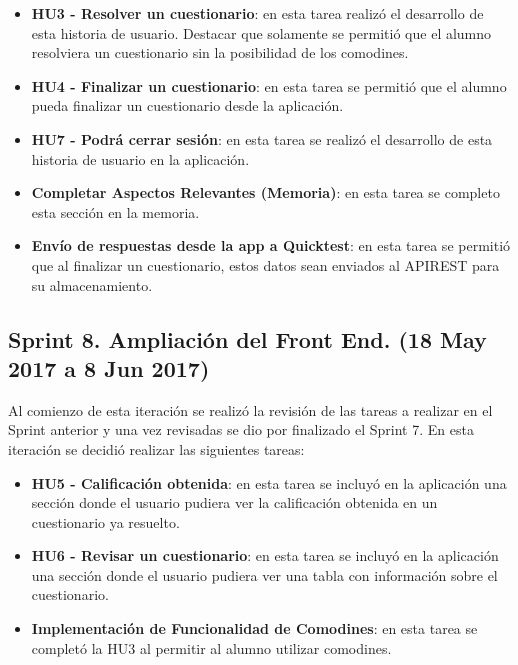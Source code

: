 \begin{itemize}

	\item \textbf{HU3 - Resolver un cuestionario}: en esta tarea realizó el desarrollo de esta historia de usuario. Destacar que solamente se permitió que el alumno resolviera un cuestionario sin la posibilidad de los comodines.
	\item \textbf{HU4 - Finalizar un cuestionario}: en esta tarea se permitió que el alumno pueda finalizar un cuestionario desde la aplicación.
	\item \textbf{HU7 - Podrá cerrar sesión}: en esta tarea se realizó el desarrollo de esta historia de usuario en la aplicación.
	\item \textbf{Completar Aspectos Relevantes (Memoria)}: en esta tarea se completo esta sección en la memoria.
	\item \textbf{Envío de respuestas desde la app a Quicktest}: en esta tarea se permitió que al finalizar un cuestionario, estos datos sean enviados al APIREST para su almacenamiento.


\end{itemize}



\subsection{Sprint 8. Ampliación del Front End. (18 May 2017 a 8 Jun 2017)}

Al comienzo de esta iteración se realizó la revisión de las tareas a realizar en el Sprint anterior y una vez revisadas se dio por finalizado el Sprint 7. 
En esta iteración se decidió realizar las siguientes tareas:

\begin{itemize}

	\item \textbf{HU5 - Calificación obtenida}: en esta tarea se incluyó en la aplicación una sección donde el usuario pudiera ver la calificación obtenida en un cuestionario ya resuelto.
	\item \textbf{HU6 - Revisar un cuestionario}: en esta tarea se incluyó en la aplicación una sección donde el usuario pudiera ver una tabla con información sobre el cuestionario.
	\item \textbf{Implementación de Funcionalidad de Comodines}: en esta tarea se completó la HU3 al permitir al alumno utilizar comodines.


\end{itemize}

